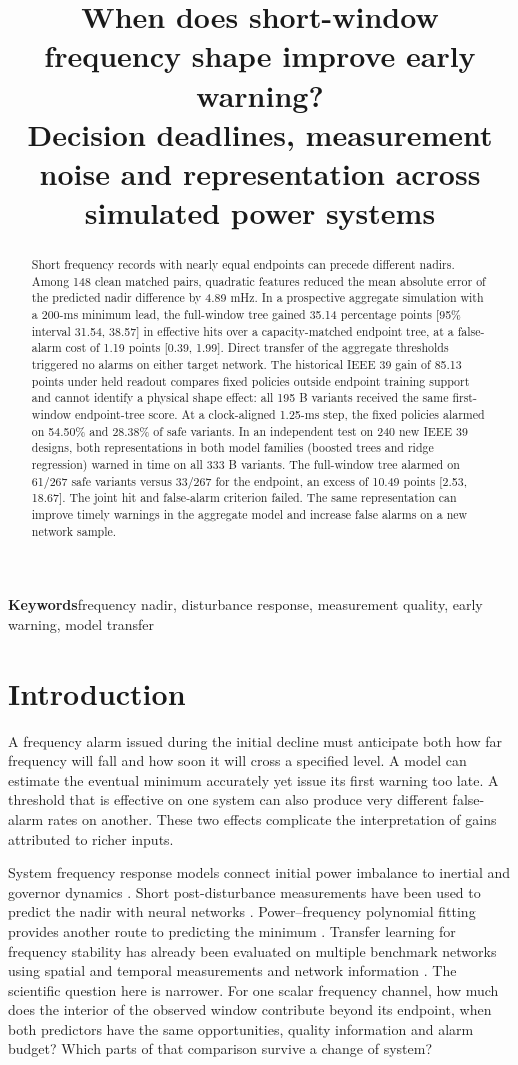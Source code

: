 \documentclass[10pt]{article}
\title{When does short-window frequency shape improve early warning?\\ Decision deadlines, measurement noise and representation across simulated power systems}
\author{}\date{}
\begin{document}
\maketitle\vspace{-2.8em}
\begin{abstract}
Short frequency records with nearly equal endpoints can precede different nadirs. Among 148 clean matched pairs, quadratic features reduced the mean absolute error of the predicted nadir difference by 4.89 mHz. In a prospective aggregate simulation with a 200-ms minimum lead, the full-window tree gained 35.14 percentage points [95\% interval 31.54, 38.57] in effective hits over a capacity-matched endpoint tree, at a false-alarm cost of 1.19 points [0.39, 1.99]. Direct transfer of the aggregate thresholds triggered no alarms on either target network. The historical IEEE 39 gain of 85.13 points under held readout compares fixed policies outside endpoint training support and cannot identify a physical shape effect: all 195 B variants received the same first-window endpoint-tree score. At a clock-aligned 1.25-ms step, the fixed policies alarmed on 54.50\% and 28.38\% of safe variants. In an independent test on 240 new IEEE 39 designs, both representations in both model families (boosted trees and ridge regression) warned in time on all 333 B variants. The full-window tree alarmed on 61/267 safe variants versus 33/267 for the endpoint, an excess of 10.49 points [2.53, 18.67]. The joint hit and false-alarm criterion failed. The same representation can improve timely warnings in the aggregate model and increase false alarms on a new network sample.
\end{abstract}
\noindent\textbf{Keywords}\quad frequency nadir, disturbance response, measurement quality, early warning, model transfer

\section{Introduction}
A frequency alarm issued during the initial decline must anticipate both how far frequency will fall and how soon it will cross a specified level. A model can estimate the eventual minimum accurately yet issue its first warning too late. A threshold that is effective on one system can also produce very different false-alarm rates on another. These two effects complicate the interpretation of gains attributed to richer inputs.

System frequency response models connect initial power imbalance to inertial and governor dynamics \cite{sfr,liu}. Short post-disturbance measurements have been used to predict the nadir with neural networks \cite{early}. Power--frequency polynomial fitting provides another route to predicting the minimum \cite{polynomial}. Transfer learning for frequency stability has already been evaluated on multiple benchmark networks using spatial and temporal measurements and network information \cite{transfer}. The scientific question here is narrower. For one scalar frequency channel, how much does the interior of the observed window contribute beyond its endpoint, when both predictors have the same opportunities, quality information and alarm budget? Which parts of that comparison survive a change of system?
\end{document}
